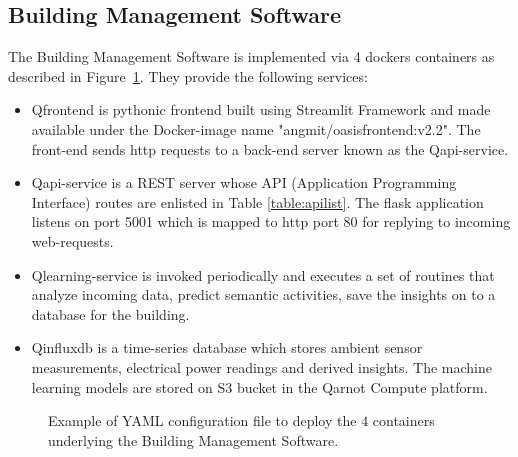 \subsection{Building Management Software }
The Building Management Software is implemented via 4 dockers containers as described in Figure~\ref{fig:yaml_bms}. They provide the following services:
\begin{itemize}
    \item Qfrontend is pythonic frontend built using Streamlit Framework and made available under the Docker-image name "angmit/oasisfrontend:v2.2". The front-end sends http requests to a back-end server known as the Qapi-service.
    \item Qapi-service is a REST server whose API (Application Programming Interface) routes are enlisted in Table \ref{table:apilist}. The flask application listens on port 5001 which is mapped to http port 80 for replying to incoming web-requests.   
    \item Qlearning-service is invoked periodically and executes a set of routines that analyze incoming data, predict semantic activities, save the insights on to a database for the building.
    \item Qinfluxdb  is a time-series database which stores ambient sensor measurements, electrical power readings and derived insights. The machine learning models are stored on S3 bucket in the Qarnot Compute platform.
\end{itemize}
\begin{figure}[h!]
     \centering
      \caption{Example of YAML configuration file to deploy the $4$ containers underlying the Building Management Software.}%
    \label{fig:yaml_bms}%
\end{figure}






